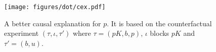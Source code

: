 \begin{figure}
  \vspace*{-0.5cm}
  \begin{center}
    \texttt{[image: figures/dot/cex.pdf]}
  \end{center}
  \vspace{-0.8cm}
  \caption{A better causal explanation for $p$. It is based on the
    counterfactual experiment $(\tau, \iota, \tau')$ where
    $\tau = (pK, b, p)$, $\iota$ blocks $pK$ and $\tau' = (b, u)$.}
  \label{fig:cex}
\end{figure}
